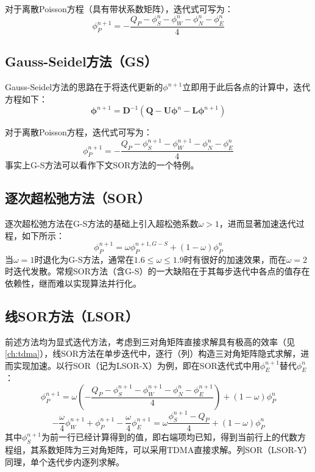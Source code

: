 \documentclass[11pt]{article}
\begin{document}
对于离散Poisson方程（具有带状系数矩阵），迭代式可写为：
\begin{equation}
	\phi_P^{n+1}=-\frac{Q_P-\phi_S^n-\phi_W^n-\phi_N^n-\phi_E^n}{4}
\end{equation}

\subsection{Gauss-Seidel方法（GS）}
Gauss-Seidel方法的思路在于将迭代更新的$\phi^{n+1}$立即用于此后各点的计算中，迭代方程如下：
\begin{equation}
	\bm{\phi}^{n+1}=\bm{D}^{-1}\left(\bm{Q}-\bm{U}\bm{\phi}^n-\bm{L}\bm{\phi}^{n+1}\right)
\end{equation}

对于离散Poisson方程，迭代式可写为：
\begin{equation}
	\phi_P^{n+1}=-\frac{Q_P-\phi_S^{n+1}-\phi_W^{n+1}-\phi_N^n-\phi_E^n}{4}
\end{equation}
事实上G-S方法可以看作下文SOR方法的一个特例。

\subsection{逐次超松弛方法（SOR）}
逐次超松弛方法在G-S方法的基础上引入超松弛系数$\omega>1$，进而显著加速迭代过程，如下所示：
\begin{equation}
	\phi_P^{n+1}=\omega\phi_P^{n+1,G-S}+(1-\omega)\phi_P^n
\end{equation}
当$\omega=1$时退化为G-S方法，通常在$1.6\leq\omega\leq1.9$时有很好的加速效果，而在$\omega=2$时迭代发散。常规SOR方法（含G-S）的一大缺陷在于其每步迭代中各点的值存在依赖性，继而难以实现算法并行化。

\subsection{线SOR方法（LSOR）}
前述方法均为显式迭代方法，考虑到三对角矩阵直接求解具有极高的效率（见\autoref{ch:tdma}），线SOR方法在单步迭代中，逐行（列）构造三对角矩阵隐式求解，进而实现加速。以行SOR（记为LSOR-X）为例，即在SOR迭代式中用$\phi_E^{n+1}$替代$\phi_E^n$：
\begin{equation}
	\phi_P^{n+1}=\omega\left(-\frac{Q_P-\phi_S^{n+1}-\phi_W^{n+1}-\phi_N^n-\phi_E^{n+1}}{4}\right)+(1-\omega)\phi_P^n
\end{equation}
\begin{equation}
	-\frac{\omega}{4}\phi_W^{n+1}+\phi_P^{n+1}-\frac{\omega}{4}\phi_E^{n+1}=\omega\frac{\phi_S^{n+1}-Q_P}{4}+(1-\omega)\phi_P^n
\end{equation}
其中$\phi_S^{n+1}$为前一行已经计算得到的值，即右端项均已知，得到当前行上的代数方程组，其系数矩阵为三对角矩阵，可以采用TDMA直接求解。列SOR（LSOR-Y）同理，单个迭代步内逐列求解。
\end{document}
